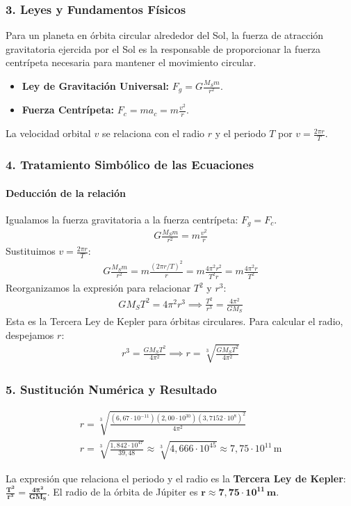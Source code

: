 \subsubsection*{3. Leyes y Fundamentos Físicos}
Para un planeta en órbita circular alrededor del Sol, la fuerza de atracción gravitatoria ejercida por el Sol es la responsable de proporcionar la fuerza centrípeta necesaria para mantener el movimiento circular.
\begin{itemize}
    \item \textbf{Ley de Gravitación Universal:} $F_g = G \frac{M_S m}{r^2}$.
    \item \textbf{Fuerza Centrípeta:} $F_c = m a_c = m \frac{v^2}{r}$.
\end{itemize}
La velocidad orbital $v$ se relaciona con el radio $r$ y el periodo $T$ por $v = \frac{2\pi r}{T}$.

\subsubsection*{4. Tratamiento Simbólico de las Ecuaciones}
\paragraph{Deducción de la relación}
Igualamos la fuerza gravitatoria a la fuerza centrípeta: $F_g = F_c$.
\begin{gather}
    G \frac{M_S m}{r^2} = m \frac{v^2}{r}
\end{gather}
Sustituimos $v = \frac{2\pi r}{T}$:
\begin{gather}
    G \frac{M_S m}{r^2} = m \frac{(2\pi r/T)^2}{r} = m \frac{4\pi^2 r^2}{T^2 r} = m \frac{4\pi^2 r}{T^2}
\end{gather}
Reorganizamos la expresión para relacionar $T^2$ y $r^3$:
\begin{gather}
    G M_S T^2 = 4\pi^2 r^3 \implies \frac{T^2}{r^3} = \frac{4\pi^2}{G M_S}
\end{gather}
Esta es la Tercera Ley de Kepler para órbitas circulares. Para calcular el radio, despejamos $r$:
\begin{gather}
    r^3 = \frac{G M_S T^2}{4\pi^2} \implies r = \sqrt[3]{\frac{G M_S T^2}{4\pi^2}}
\end{gather}

\subsubsection*{5. Sustitución Numérica y Resultado}
\begin{gather}
    r = \sqrt[3]{\frac{(6,67\cdot10^{-11})(2,00\cdot10^{30})(3,7152\cdot10^8)^2}{4\pi^2}} \nonumber \\
    r = \sqrt[3]{\frac{1,842\cdot10^{47}}{39,48}} \approx \sqrt[3]{4,666\cdot10^{45}} \approx 7,75\cdot10^{11}\,\text{m}
\end{gather}
\begin{cajaresultado}
La expresión que relaciona el periodo y el radio es la \textbf{Tercera Ley de Kepler}: $\boldsymbol{\frac{T^2}{r^3} = \frac{4\pi^2}{G M_S}}$.
El radio de la órbita de Júpiter es $\boldsymbol{r \approx 7,75\cdot10^{11}\,\textbf{m}}$.
\end{cajaresultado}

